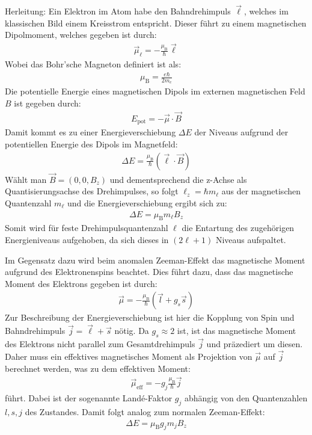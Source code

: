\documentclass[11pt, a4paper]{article}
\begin{document}
Herleitung:
Ein Elektron im Atom habe den Bahndrehimpuls $\vec{\ell}$, welches im klassischen Bild einem Kreisstrom entspricht.
Dieser führt zu einem magnetischen Dipolmoment, welches gegeben ist durch:
\begin{align}
	\vec{\mu}_\ell = - \frac{\mu_\mathrm{B}}{\hbar} \vec{\ell}
\end{align}
Wobei das Bohr'sche Magneton definiert ist als:
\begin{align}
	\mu_\mathrm{B} = \frac{e \hbar}{2 m_e}
\end{align}
Die potentielle Energie eines magnetischen Dipols im externen magnetischen Feld $B$ ist gegeben durch:
\begin{align}
	E_\mathrm{pot} = - \vec{\mu} \cdot \vec{B}
\end{align}
Damit kommt es zu einer Energieverschiebung $\Delta E$ der Niveaus aufgrund der potentiellen Energie des Dipols im Magnetfeld:
\begin{align}
	\Delta E = \frac{\mu_\mathrm{B}}{\hbar} \left( \vec{\ell} \cdot \vec{B} \right)
\end{align}
Wählt man $\vec{B} = (0,0,B_z)$ und dementsprechend die z-Achse als Quantisierungsachse des Drehimpulses, so folgt $\ell_z = \hbar m_\ell$ aus der magnetischen Quantenzahl $m_\ell$ und die Energieverschiebung ergibt sich zu:
\begin{align}
	\Delta E = \mu_\mathrm{B} m_\ell B_z
\end{align}
Somit wird für feste Drehimpulsquantenzahl $\ell$ die Entartung des zugehörigen Energieniveaus aufgehoben, da sich dieses in $(2\ell + 1)$ Niveaus aufspaltet.

Im Gegensatz dazu wird beim anomalen Zeeman-Effekt das magnetische Moment aufgrund des Elektronenspins beachtet.
Dies führt dazu, dass das magnetische Moment des Elektrons gegeben ist durch:
\begin{align}
\vec{\mu} = -\frac{\mu_\mathrm{B}}{\hbar} \left( \vec{l} + g_s \vec{s} \right)
\label{eq:magmom_spin}
\end{align}
Zur Beschreibung der Energieverschiebung ist hier die Kopplung von Spin und Bahndrehimpuls $\vec{j} = \vec{\ell} + \vec{s}$ nötig.
Da $g_s \approx 2$ ist, ist das magnetische Moment des Elektrons nicht parallel zum Gesamtdrehimpuls $\vec{j}$ und präzediert um diesen.
Daher muss ein effektives magnetisches Moment als Projektion von $\vec{\mu}$ auf $\vec{j}$ berechnet werden, was zu dem effektiven Moment:
\begin{align}
	\vec{\mu}_\mathrm{eff} = - g_j \frac{\mu_\mathrm{B}}{\hbar} \vec{j} 
\end{align}
führt.
Dabei ist der sogenannte Landé-Faktor $g_j$ abhängig von den Quantenzahlen $l,s,j$ des Zustandes.
Damit folgt analog zum normalen Zeeman-Effekt:
\begin{align}
	\Delta E = \mu_\mathrm{B} g_j m_j B_z
\end{align}
\end{document}
